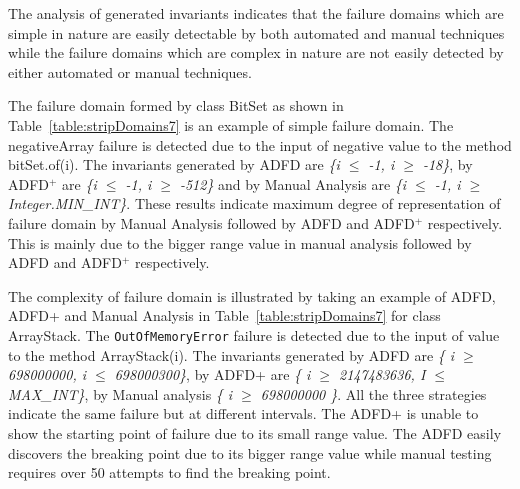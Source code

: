 The analysis of generated invariants indicates that the failure domains which are simple in nature are easily detectable by both automated and manual techniques while the failure domains which are complex in nature are not easily detected by either automated or manual techniques. %

The failure domain formed by class BitSet as shown in Table~\ref{table:stripDomains7} is an example of simple failure domain. The negativeArray failure is detected due to the input of negative value to the method bitSet.of(i). The invariants generated by ADFD are \textit{\{i $\le$ -1, i $\ge$ -18\}}, by ADFD$^+$ are \textit{\{i $\le$ -1, i $\ge$ -512\}} and by Manual Analysis are \textit{\{i $\le$ -1, i $\ge$ Integer.MIN\_INT\}}. These results indicate maximum degree of representation of failure domain by Manual Analysis followed by ADFD and ADFD$^+$ respectively. This is mainly due to the bigger range value in manual analysis followed by ADFD and ADFD$^+$ respectively. 


The complexity of failure domain is illustrated by taking an example of ADFD, ADFD+ and Manual Analysis in Table~\ref{table:stripDomains7} for class ArrayStack. The \verb+OutOfMemoryError+ failure is detected due to the input of value to the method ArrayStack(i). The invariants generated by ADFD are \textit{\{ i $\ge$ 698000000, i $\le$ 698000300\}}, by ADFD+ are \textit{\{ i $\ge$ 2147483636, I $\le$ MAX\_INT\}}, by Manual analysis \textit{\{ i $\ge$ 698000000 \}}. All the three strategies indicate the same failure but at different intervals. The ADFD+ is unable to show the starting point of failure due to its small range value. The ADFD easily discovers the breaking point due to its bigger range value while manual testing requires over 50 attempts to find the breaking point.





